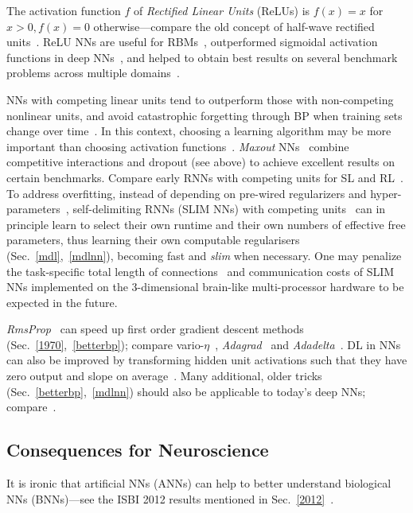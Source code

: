 \documentclass[letterpaper]{article}
\begin{document}
\begin{CJK*}{UTF8}{gbsn}
\begin{sloppypar}
The activation function $f$ of {\em Rectified Linear Units} (ReLUs)  is
$f(x) =  x$ for $x > 0, f(x)=0$ otherwise---compare the old concept of half-wave rectified units~\citep{malik1990}.
ReLU NNs are useful for RBMs~\citep{Nair2010,Maas2013}, outperformed sigmoidal activation
functions in deep NNs~\citep{Glorot2011a}, and helped to obtain  best results on several benchmark 
problems across multiple domains~\citep[e.g.,][]{Krizhevsky:2012,Dahl2013}.



NNs with competing linear units tend to outperform those with non-competing nonlinear
units, and avoid catastrophic forgetting through BP 
when training sets change over time~\citep{srivastava2013compete}. In this context,
choosing a learning algorithm may be more important than choosing activation functions~\citep{Goodfellow2014}.
{\em Maxout} NNs~\citep{goodfellow2013maxout} combine
competitive interactions and 
dropout (see above) to achieve excellent results on certain
benchmarks.
Compare early RNNs with competing units for SL and RL~\citep{Schmidhuber:89cs}.
To address overfitting, instead of depending on  pre-wired regularizers and hyper-parameters~\citep{Hertz:91,bishop:2006},
self-delimiting RNNs (SLIM NNs) with competing units~\citep{Schmidhuber:12slimnn}
can in principle learn to select their own runtime and their own numbers of effective free parameters,
thus learning their own computable regularisers (Sec.~\ref{mdl},~\ref{mdlnn}), 
 becoming fast and  {\em slim} when necessary.
One may  penalize the task-specific  total length of connections~\citep[e.g.,][]{maass2002wire,Schmidhuber:12slimnn,Schmidhuber:13powerplay,clune2013modular} 
and communication costs of 
SLIM NNs implemented on the 3-dimensional brain-like multi-processor 
hardware to be expected in the future.


{\em RmsProp}~\citep{Tieleman2012,Schaul2012} can speed up first order gradient descent methods (Sec.~\ref{1970},~\ref{betterbp}); 
compare vario-$\eta$~\citep{DBLP:conf/nips/NeuneierZ96},
{\em Adagrad}~\citep{Duchi2011} and {\em Adadelta}~\citep{zeiler2012}.
DL in NNs can also be improved
by transforming hidden unit activations such that they have zero output and slope on average~\citep{raiko2012}.
Many additional, older tricks (Sec.~\ref{betterbp},~\ref{mdlnn}) should also be applicable to today's deep NNs;
compare~\citep{orr1998neural,tricksofthetrade:2012}.




\subsection{Consequences for Neuroscience}
\label{bnn}
It is ironic that artificial NNs (ANNs) can help to better understand biological NNs (BNNs)---see the ISBI 2012 results 
mentioned in Sec.~\ref{2012}~\citep{isbi12,ciresan2012nips}.


\end{sloppypar}
\end{CJK*}
\end{document}
